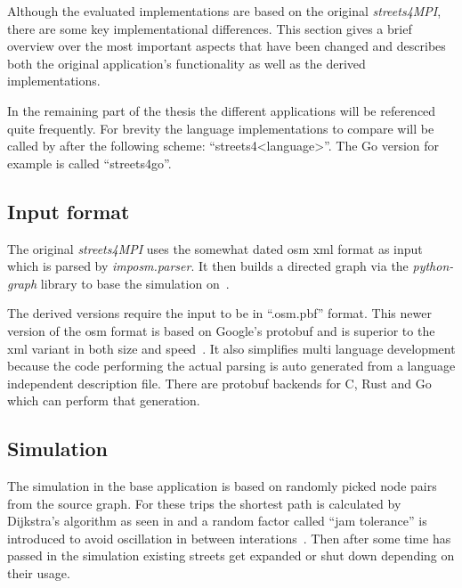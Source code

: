 Although the evaluated implementations are based on the original \textit{streets4MPI}, there are some key implementational differences. This section gives a brief overview over the most important aspects that have been changed and describes both the original application's functionality as well as the derived implementations.

In the remaining part of the thesis the different applications will be referenced quite frequently. For brevity the language implementations to compare will be called by after the following scheme: ``streets4<language>''. The Go version for example is called ``streets4go''.

\subsection*{Input format}
\label{subsec:Approach::Differences::Input}

The original \textit{streets4MPI} uses the somewhat dated \gls{osm} \gls{xml} format as input which is parsed by \textit{imposm.parser}. It then builds a directed graph via the \textit{python-graph} library to base the simulation on~\cite{streets_report}.

The derived versions require the input to be in ``.osm.pbf'' format. This newer version of the \gls{osm} format is based on Google's \gls{protobuf} and is superior to the \gls{xml} variant in both size and speed~\cite{osm_wiki_pbf}. It also simplifies multi language development because the code performing the actual parsing is auto generated from a language independent description file. There are \gls{protobuf} backends for C, Rust and Go which can perform that generation.

\subsection*{Simulation}
\label{subsec:Approach::Differences::Simulation}

The simulation in the base application is based on randomly picked node pairs from the source graph. For these trips the shortest path is calculated by Dijkstra's algorithm as seen in \cite{cormen} and a random factor called ``jam tolerance'' is introduced to avoid oscillation in between interations~\cite{streets_report}. Then after some time has passed in the simulation existing streets get expanded or shut down depending on their usage.

